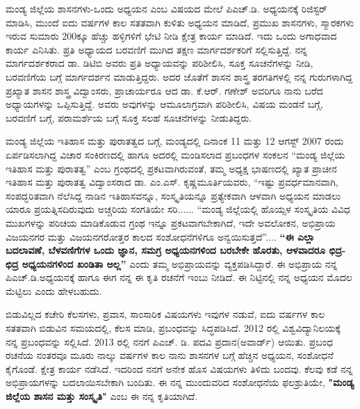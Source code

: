 ಮಂಡ್ಯ ಜಿಲ್ಲೆಯ ಶಾಸನಗಳು{\rm -}ಒಂದು ಅಧ್ಯಯನ ಎಂಬ ವಿಷಯದ ಮೇಲೆ ಪಿಎಚ್​.ಡಿ. ಅಧ್ಯಯನಕ್ಕೆ ರಿಜಿಸ್ಟರ್​ ಮಾಡಿಸಿ, ಮುಂದೆ ಐದು ವರ್ಷಗಳ ಕಾಲ ಸತತವಾಗಿ ಕುಳಿತು ಅಧ್ಯಯನ ಮಾಡಿದೆ, ಪ್ರಮುಖ ಶಾಸನಗಳು, ಸ್ಮಾರಕಗಳು ಇರುವ ಸುಮಾರು 200ಕ್ಕೂ ಹೆಚ್ಚು ಹಳ್ಳಿಗಳಿಗೆ ಭೇಟಿ ನೀಡಿ ಕ್ಷೇತ್ರ ಕಾರ್ಯ ಮಾಡಿದೆ. ಇದು ಒಂದು ಅಗಾಧವಾದ ಕಾರ್ಯ ಎನಿಸಿತು. ಪ್ರತಿ ಅಧ್ಯಾಯದ ಬರವಣಿಗೆ ಮುಗಿದ ತಕ್ಷಣ ಮಾರ್ಗದರ್ಶಕರಿಗೆ ಸಲ್ಲಿಸುತ್ತಿದ್ದೆ. ನನ್ನ ಮಾರ್ಗದರ್ಶಕರಾದ ಡಾ. ಡಿಟಿಬಿ ಅವರು ಪ್ರತಿ ಅಧ್ಯಾಯವನ್ನು ಪರಿಶೀಲಿಸಿ, ಸೂಕ್ತ ಸೂಚನೆಗಳನ್ನು ನೀಡಿ, ಬರವಣಿಗೆಯ ಬಗ್ಗೆ ಮಾರ್ಗದರ್ಶನ ಮಾಡುತ್ತಿದ್ದರು. ಅದರ ಜೊತೆಗೆ ಶಾಸನ ಶಾಸ್ತ್ರ ತರಗತಿಗಳಲ್ಲಿ ನನ್ನ ಗುರುಗಳಾಗಿದ್ದ ಪ್ರಖ್ಯಾತ ಶಾಸನ ಶಾಸ್ತ್ರ ವಿದ್ವಾಂಸರು, ಪ್ರಾಚಾರ್ಯರೂ ಆದ ಡಾ. ಕೆ.ಆರ್​. ಗಣೇಶ್​ ಅವರಿಗೂ ನಾನು ಬರೆದ ಅಧ್ಯಾಯಗಳನ್ನು ಒಪ್ಪಿಸುತ್ತಿದ್ದೆ. ಅವರು ಅವುಗಳನ್ನು ಆಮೂಲಾಗ್ರವಾಗಿ ಪರಿಶೀಲಿಸಿ, ವಿಷಯ ಮಂಡನೆ ಬಗ್ಗೆ, ಬರವಣಿಗೆ ಬಗ್ಗೆ, ಪರಾಮರ್ಶೆಯ ಬಗ್ಗೆ ಸೂಕ್ತ ಸಲಹೆ ಸೂಚನೆಗಳನ್ನು ನೀಡುತಿದ್ದರು.

ಮಂಡ್ಯ ಜಿಲ್ಲೆಯ ಇತಿಹಾಸ ಮತ್ತು ಪುರಾತತ್ವದ ಬಗ್ಗೆ, ಮಂಡ್ಯದಲ್ಲಿ ದಿನಾಂಕ 11 ಮತ್ತು 12 ಆಗಸ್ಟ್​ 2007 ರಂದು ಏರ್ಪಡಿಸಲಾಗಿದ್ದ ವಿಚಾರ ಸಂಕಿರಣದಲ್ಲಿ ಹಾಗೂ ಅದರಲ್ಲಿ ಮಂಡಿಸಲಾದ ಪ್ರಬಂಧಗಳ ಸಂಕಲನ “ಮಂಡ್ಯ ಜಿಲ್ಲೆಯ ಇತಿಹಾಸ ಮತ್ತು ಪುರಾತತ್ವ”  ಎಂಬ ಗ್ರಂಥದಲ್ಲಿ ಪ್ರಕಟವಾಗಿರುವಂತೆ, ತಮ್ಮ ಅಧ್ಯಕ್ಷ ಭಾಷಣದಲ್ಲಿ ಖ್ಯಾತ ಪ್ರಾಚೀನ ಇತಿಹಾಸ ಮತ್ತು  ಪುರಾತತ್ವ ವಿದ್ವಾಂಸರಾದ ಡಾ. ಎಂ.ಎಸ್​. ಕೃಷ್ಣಮೂರ್ತಿಯವರು, “ಇಷ್ಟು ಪ್ರವರ್ಧಮಾನವಾಗಿ, ಸಂಪದ್ಭರಿತವಾಗಿ ನೆಲೆಸಿದ್ದ ನಾಡಿನ ಇತಿಹಾಸವನ್ನೂ, ಸಂಸ್ಕೃತಿಯನ್ನೂ ಪ್ರತ್ಯೇಕವಾಗಿ ಆಳವಾಗಿ ಅಧ್ಯಯನ ಮಾಡಲು ಯಾರೂ ಪ್ರಯತ್ನಿಸದಿರುವುದು ಅಚ್ಚರಿಯ ಸಂಗತಿಯೇ ಸರಿ...... “ಮಂಡ್ಯ ಜಿಲ್ಲೆಯಲ್ಲಿ ಹೊಯ್ಸಳ ಸಂಸ್ಕೃತಿಯ ವಿವಿಧ ಮುಖ\-ಗಳನ್ನು ಪರಿಚಯ ಮಾಡಿಕೊಡುವ ಗ್ರಂಥ ಇನ್ನೂ ಪ್ರಕಟವಾಗಬೇಕಾಗಿದೆ, ಇದೇ ಅವಲೋಕನ, ಅಭಿಪ್ರಾಯ ವಿಜಯನಗರ ಮತ್ತು ವಿಜಯನಗರೋತ್ತರ ಕಾಲದ ಸಂಶೋಧನೆಗಳಿಗೂ ಅನ್ವಯಿಸುತ್ತದೆ”.... \textbf{“ಈ ಎಲ್ಲಾ ಬದಲಾವಣೆ, ಬೆಳವಣಿಗೆಗಳ ಒಂದು ಜ್ಞಾನ, ಸಮಗ್ರ ಅಧ್ಯಯನಗಳಿಂದ ಬರಬೇಕೇ ಹೊರತು, ಆಳವಾದರೂ ಛಿದ್ರ{\rm -}ಛಿದ್ರ ಅಧ್ಯಯನಗಳಿಂದ ಖಂಡಿತಾ ಅಲ್ಲ”} ಎಂದು ತಮ್ಮ ಅಭಿಪ್ರಾಯವನ್ನು ವ್ಯಕ್ತಪಡಿಸಿದ್ದಾರೆ. ಈ ಅಭಿಪ್ರಾಯ ನನ್ನ ಪಿಎಚ್​.ಡಿ.ಅಧ್ಯಯನಕ್ಕೆ ಹಾಗೂ ಈಗ ನನ್ನ ಈ  ಕೃತಿ ರಚನೆಗೆ ಇಂಬು ನೀಡಿದೆ. ಈ ನಿಟ್ಟಿನಲ್ಲಿ ನನ್ನ ಅಧ್ಯಯನ ಮೊದಲ ಮೆಟ್ಟಿಲು ಎಂದು ಹೇಳಬಹುದು.

ಬಿಡುವಿಲ್ಲದ ಕಚೇರಿ ಕೆಲಸಗಳು, ಪ್ರವಾಸ, ಸಾಂಸಾರಿಕ ವಿಷಯಗಳು ಇವುಗಳ ನಡುವೆ, ಐದು ವರ್ಷಗಳ ಕಾಲ ಸತತವಾಗಿ ಬಿಡುವಿನ ಸಮಯದಲ್ಲಿ, ಕೆಲಸ ಮಾಡಿ, ಪ್ರಬಂಧವನ್ನು ಸಿದ್ಧಪಡಿಸಿದೆ. 2012 ರಲ್ಲಿ ವಿಶ್ವವಿದ್ಯಾನಿಲಯಕ್ಕೆ ನನ್ನ ಪ್ರಬಂಧವನ್ನು ಸಲ್ಲಿಸಿದೆ. 2013 ರಲ್ಲಿ ನನಗೆ ಪಿಎಚ್. ಡಿ. ಪದವಿ ಪ್ರದಾನ(ಅವಾರ್ಡ್) ಆಯಿತು.  ಪ್ರಬಂಧ ರಚನೆಯ ನಂತರವೂ ಮೂರು ನಾಲ್ಕು ವರ್ಷಗಳ ಕಾಲ ನಾನು ಶಾಸನಗಳ ಬಗ್ಗೆ ಹೆಚ್ಚಿನ ಅಧ್ಯಯನ, ಸಂಶೋಧನೆ ಕೈಗೊಂಡೆ. ಕ್ಷೇತ್ರ ಕಾರ್ಯ ನಡೆಸಿದೆ. ಇದರಿಂದ ನನಗೆ ಅನೇಕ ಹೊಸ ವಿಷಯಗಳು ತಿಳಿದು ಬಂದವು. ಕೆಲವು ಕಡೆ ನನ್ನ ಅಭಿಪ್ರಾಯಗಳನ್ನು ಬದಲಾ\-ಯಿಸಬೇಕಾಗಿ ಬಂದಿತು. ಈ ನನ್ನ ಮುಂದುವರಿದ ಸಂಶೋಧನೆಯ ಫಲಶ್ರುತಿಯೇ, \textbf{"ಮಂಡ್ಯ ಜಿಲ್ಲೆಯ ಶಾಸನ ಮತ್ತು ಸಂಸ್ಕೃತಿ"} ಎಂಬ ಈ ನನ್ನ ಕೃತಿಯಾಗಿದೆ.

